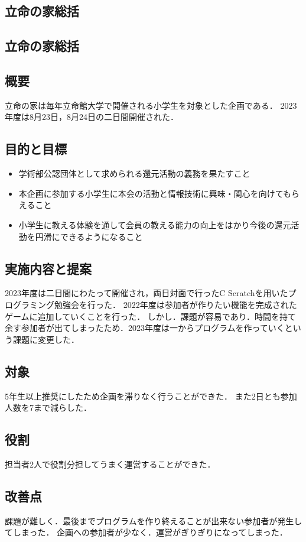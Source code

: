 \subsection*{立命の家総括}
\subsection*{立命の家総括}


\subsection*{概要}
立命の家は毎年立命館大学で開催される小学生を対象とした企画である．
2023年度は8月23日，8月24日の二日間開催された．

\subsection*{目的と目標}
\begin{itemize}
    \item 学術部公認団体として求められる還元活動の義務を果たすこと
    \item 本企画に参加する小学生に本会の活動と情報技術に興味・関心を向けてもらえること
    \item 小学生に教える体験を通して会員の教える能力の向上をはかり今後の還元活動を円滑にできるようになること
\end{itemize}
\subsection*{実施内容と提案}
2023年度は二日間にわたって開催され，両日対面で行ったC
Scratchを用いたプログラミング勉強会を行った．
2022年度は参加者が作りたい機能を完成されたゲームに追加していくことを行った．
しかし．課題が容易であり．時間を持て余す参加者が出てしまったため．2023年度は一からプログラムを作っていくという課題に変更した．

\subsection*{対象}
5年生以上推奨にしたため企画を滞りなく行うことができた．
また2日とも参加人数を7まで減らした．

\subsection*{役割}
担当者2人で役割分担してうまく運営することができた．

\subsection*{改善点}
課題が難しく．最後までプログラムを作り終えることが出来ない参加者が発生してしまった．
企画への参加者が少なく．運営がぎりぎりになってしまった．
